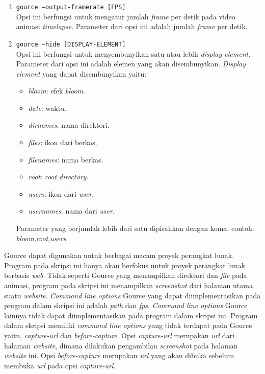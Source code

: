 \begin{enumerate}
\item \texttt{gource --output-framerate [FPS]}\\
Opsi ini berfungsi untuk mengatur jumlah \textit{frame} per detik pada video animasi \textit{timelapse}. Parameter dari opsi ini adalah jumlah \textit{frame} per detik.

\item \texttt{gource --hide [DISPLAY-ELEMENT]}\\
Opsi ini berfungsi untuk menyembunyikan satu atau lebih \textit{display element}. Parameter dari opsi ini adalah elemen yang akan disembunyikan. \textit{Display element} yang dapat disembunyikan yaitu:
\begin{itemize}
\item \textit{bloom}: efek \textit{bloom}. 
\item \textit{date}: waktu.  
\item \textit{dirnames}: nama direktori. 
\item \textit{files}: ikon dari berkas. 
\item \textit{filenames}: nama berkas. 
\item \textit{root}: \textit{root directory}.
\item \textit{users}: ikon dari \textit{user}.
\item \textit{usernames}: nama dari \textit{user}.
\end{itemize}
Parameter yang berjumlah lebih dari satu dipisahkan dengan koma, contoh: \textit{bloom},\textit{root},\textit{users}.
\end{enumerate}
 
Gource dapat digunakan untuk berbagai macam proyek perangkat lunak. Program pada skripsi ini hanya akan berfokus untuk proyek perangkat lunak berbasis \textit{web}. Tidak seperti Gource yang menampilkan direktori dan \textit{file} pada animasi, program pada skripsi ini menampilkan \textit{screenshot} dari halaman utama suatu \textit{website}. \textit{Command line options} Gource yang dapat diimplementasikan pada program dalam skripsi ini adalah \textit{path} dan \textit{fps}. \textit{Command line options} Gource lainnya tidak dapat diimplementasikan pada program dalam skripsi ini. Program dalam skripsi memiliki \textit{command line options} yang tidak terdapat pada Gource yaitu, \textit{capture-url} dan \textit{before-capture}. Opsi \textit{capture-url} merupakan \textit{url} dari halaman \textit{website}, dimana dilakukan pengambilan \textit{screenshot} pada halaman \textit{website} ini. Opsi \textit{before-capture} merupakan \textit{url} yang akan dibuka sebelum membuka \textit{url} pada opsi \textit{capture-url}.      
 
